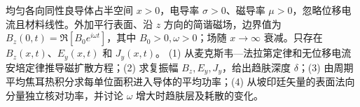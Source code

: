 均匀各向同性良导体占半空间 \(x>0\)，电导率 \(\sigma>0\)、磁导率 \(\mu>0\)，忽略位移电流且材料线性。外加平行表面、沿 \(z\) 方向的简谐磁场，边界值为 \(B_z(0,t)=\Re[B_0e^{i\omega t}]\)，其中 \(B_0>0,\omega>0\)；场随 \(x\to\infty\) 衰减。只存在 \(B_z(x,t)\)、\(E_y(x,t)\) 和 \(J_y(x,t)\)。
(1) 从麦克斯韦—法拉第定律和无位移电流安培定律推导磁扩散方程；(2) 求复振幅 \(B_z,E_y,J_y\)，给出趋肤深度 \(\delta\)；(3) 由周期平均焦耳热积分求每单位面积进入导体的平均功率；(4) 从坡印廷矢量的表面法向分量独立核对功率，并讨论 \(\omega\) 增大时趋肤层及耗散的变化。

